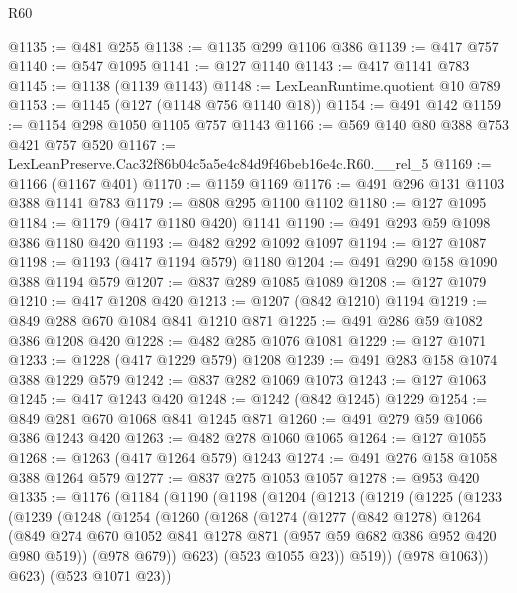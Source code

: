 \begin{lexlean}{R60}
\begin{coremodule}
@1135 := @481 @255
@1138 := @1135 @299 @1106 @386
@1139 := @417 @757
@1140 := @547 @1095
@1141 := @127 @1140
@1143 := @417 @1141 @783
@1145 := @1138 (@1139 @1143)
@1148 := LexLeanRuntime.quotient @10 @789
@1153 := @1145 (@127 (@1148 @756 @1140 @18))
@1154 := @491 @142
@1159 := @1154 @298 @1050 @1105 @757 @1143
@1166 := @569 @140 @80 @388 @753 @421 @757 @520
@1167 := LexLeanPreserve.Cac32f86b04c5a5e4c84d9f46beb16e4c.R60.__rel_5
@1169 := @1166 (@1167 @401)
@1170 := @1159 @1169
@1176 := @491 @296 @131 @1103 @388 @1141 @783
@1179 := @808 @295 @1100 @1102
@1180 := @127 @1095
@1184 := @1179 (@417 @1180 @420) @1141
@1190 := @491 @293 @59 @1098 @386 @1180 @420
@1193 := @482 @292 @1092 @1097
@1194 := @127 @1087
@1198 := @1193 (@417 @1194 @579) @1180
@1204 := @491 @290 @158 @1090 @388 @1194 @579
@1207 := @837 @289 @1085 @1089
@1208 := @127 @1079
@1210 := @417 @1208 @420
@1213 := @1207 (@842 @1210) @1194
@1219 := @849 @288 @670 @1084 @841 @1210 @871
@1225 := @491 @286 @59 @1082 @386 @1208 @420
@1228 := @482 @285 @1076 @1081
@1229 := @127 @1071
@1233 := @1228 (@417 @1229 @579) @1208
@1239 := @491 @283 @158 @1074 @388 @1229 @579
@1242 := @837 @282 @1069 @1073
@1243 := @127 @1063
@1245 := @417 @1243 @420
@1248 := @1242 (@842 @1245) @1229
@1254 := @849 @281 @670 @1068 @841 @1245 @871
@1260 := @491 @279 @59 @1066 @386 @1243 @420
@1263 := @482 @278 @1060 @1065
@1264 := @127 @1055
@1268 := @1263 (@417 @1264 @579) @1243
@1274 := @491 @276 @158 @1058 @388 @1264 @579
@1277 := @837 @275 @1053 @1057
@1278 := @953 @420
@1335 := @1176
    (@1184
      (@1190
        (@1198
          (@1204
            (@1213
              (@1219
                (@1225
                  (@1233
                    (@1239
                      (@1248
                        (@1254
                          (@1260
                            (@1268
                              (@1274
                                (@1277
                                  (@842 @1278)
                                  @1264
                                  (@849
                                    @274
                                    @670
                                    @1052
                                    @841
                                    @1278
                                    @871
                                    (@957 @59 @682 @386 @952 @420 @980 @519))
                                  (@978 @679))
                                @623)
                              (@523 @1055 @23))
                            @519))
                        (@978 @1063))
                      @623)
                    (@523 @1071 @23))

\end{coremodule}
\end{lexlean}
